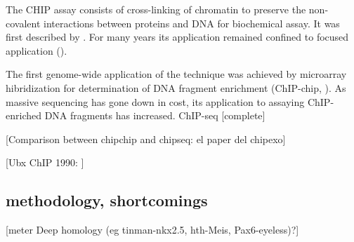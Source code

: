 The \ac{CHIP} assay consists of cross-linking of chromatin to preserve the non-covalent interactions between proteins and DNA for biochemical assay. It was first described by \cite{Solomon1988}. For many years its application remained confined to focused application (\cite{Mardis2007}).  

The first genome-wide application of the technique was achieved by microarray hibridization for determination of DNA fragment enrichment (ChIP-chip, \cite{Ren2000}). As massive sequencing has gone down in cost, its application to assaying ChIP-enriched DNA fragments has increased. ChIP-seq \cite{Robertson2007} [complete]

[Comparison between chipchip and chipseq: el paper del chipexo]

[Ubx ChIP 1990: \cite{Gould1990}]

\subsection{methodology, shortcomings}




[meter Deep homology (eg tinman-nkx2.5, hth-Meis, Pax6-eyeless)?]
